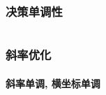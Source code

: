 \documentclass[utf8]{ctexart}
\newcommand{\cpp}[1]{\inputminted[linenos,breaklines,tabsize=4,mathescape]{c++}{#1}}
\begin{document}










\subsubsection{决策单调性}
\cpp{codes/dp/decision-monotonicity.cpp}

\subsubsection{斜率优化}
\paragraph*{斜率单调, 横坐标单调}
\cpp{codes/dp/slope.cpp}
\end{document}
